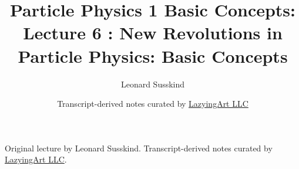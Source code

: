 \documentclass[11pt,oneside]{book}
\begin{document}
\frontmatter
\title{Particle Physics 1 Basic Concepts: Lecture 6 : New Revolutions in Particle Physics: Basic Concepts}
\author{Leonard Susskind}
\date{Transcript-derived notes curated by \href{https://lazying.art}{LazyingArt LLC}}
\maketitle
\begin{center}
\small Original lecture by Leonard Susskind. Transcript-derived notes curated by \href{https://lazying.art}{LazyingArt LLC}.
\end{center}
\clearpage
\mainmatter

\end{document}
